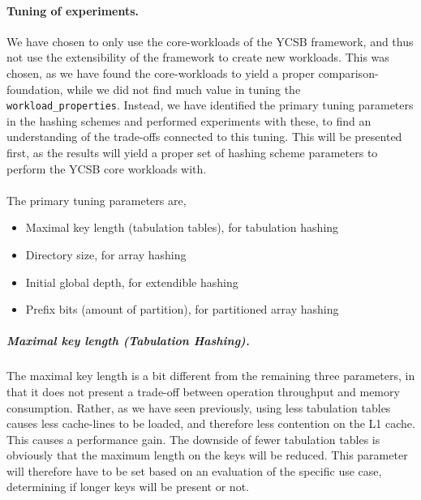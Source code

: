 \documentclass[11pt]{article} %
\begin{document}
\paragraph{Tuning of experiments.}
We have chosen to only use the core-workloads of the YCSB framework, and thus not use the extensibility of the framework to create new workloads. This was chosen, as we have found the core-workloads to yield a proper comparison-foundation, while we did not find much value in tuning the \verb|workload_properties|. Instead, we have identified the primary tuning parameters in the hashing schemes and performed experiments with these, to find an understanding of the trade-offs connected to this tuning. This will be presented first, as the results will yield a proper set of hashing scheme parameters to perform the YCSB core workloads with.\\
\\
The primary tuning parameters are,
\begin{itemize}
  \item Maximal key length (tabulation tables), for tabulation hashing
  \item Directory size, for array hashing
  \item Initial global depth, for extendible hashing
  \item Prefix bits (amount of partition), for partitioned array hashing
\end{itemize}
\subparagraph{Maximal key length (Tabulation Hashing).} The maximal key length is a bit different from the remaining three parameters, in that it does not present a trade-off between operation throughput and memory consumption. Rather, as we have seen previously, using less tabulation tables causes less cache-lines to be loaded, and therefore less contention on the L1 cache. This causes a performance gain. The downside of fewer tabulation tables is obviously that the maximum length on the keys will be reduced. This parameter will therefore have to be set based on an evaluation of the specific use case, determining if longer keys will be present or not.\\
\end{document}
